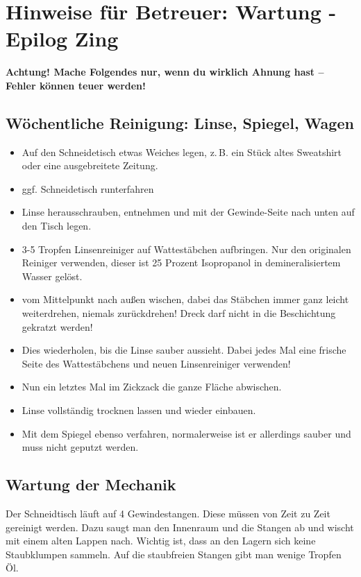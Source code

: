 \documentclass{\basedir/fablab-document}
\begin{document}
	\newpage
	\section{Hinweise für Betreuer: Wartung - Epilog Zing}

	\textbf{Achtung! Mache Folgendes nur, wenn du wirklich Ahnung hast -- Fehler können teuer werden!}

	\subsection{Wöchentliche Reinigung: Linse, Spiegel, Wagen}
	\begin{itemize}
		\label{linsenreinigung}
		\item Auf den Schneidetisch etwas Weiches legen, z.\,B. ein Stück altes Sweatshirt oder eine ausgebreitete Zeitung.
		\item ggf. Schneidetisch runterfahren
		\item Linse herausschrauben, entnehmen und mit der Gewinde-Seite nach unten auf den Tisch legen.
		\item 3-5 Tropfen Linsenreiniger auf Wattestäbchen aufbringen. Nur den originalen Reiniger verwenden, dieser ist 25 Prozent Isopropanol in demineralisiertem Wasser gelöst.
		\item vom Mittelpunkt nach außen wischen, dabei das Stäbchen immer ganz leicht weiterdrehen, niemals zurückdrehen! Dreck darf nicht in die Beschichtung gekratzt werden!
		\item Dies wiederholen, bis die Linse sauber aussieht. Dabei jedes Mal eine frische Seite des Wattestäbchens und neuen Linsenreiniger verwenden!
		\item Nun ein letztes Mal im Zickzack die ganze Fläche abwischen.
		\item Linse vollständig trocknen lassen und wieder einbauen.
		\item Mit dem Spiegel ebenso verfahren, normalerweise ist er allerdings sauber und muss nicht geputzt werden.
	\end{itemize}

	\subsection{Wartung der Mechanik}
	Der Schneidtisch läuft auf 4 Gewindestangen. Diese müssen von Zeit zu Zeit gereinigt werden. Dazu saugt man den Innenraum und die Stangen ab und wischt mit einem alten Lappen nach. Wichtig ist, dass an den Lagern sich keine Staubklumpen sammeln. Auf die staubfreien Stangen gibt man wenige Tropfen Öl.
\end{document}
